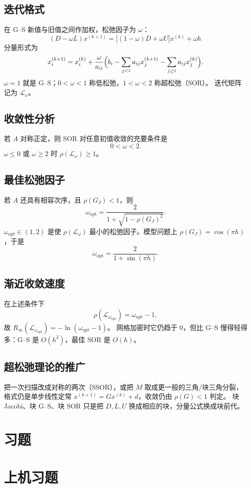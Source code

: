 \subsection{迭代格式}

在 G--S 新值与旧值之间作加权，松弛因子为 \(\omega\)：
\begin{equation}
(D-\omega L)x^{(k+1)}=\bigl[(1-\omega)D+\omega U\bigr]x^{(k)}+\omega b.
\end{equation}
分量形式为
\begin{equation}
x_i^{(k+1)}=x_i^{(k)}+\frac{\omega}{a_{ii}}\Bigl(b_i-\sum_{j<i}a_{ij}x_j^{(k+1)}-\sum_{j\ge i}a_{ij}x_j^{(k)}\Bigr).
\end{equation}
\(\omega=1\) 就是 G--S；\(0<\omega<1\) 称低松弛，\(1<\omega<2\) 称超松弛（SOR）。
迭代矩阵记为 \(\mathcal L_{\omega}\)。

\subsection{收敛性分析}

若 \(A\) 对称正定，则 SOR 对任意初值收敛的充要条件是
\begin{equation}
0<\omega<2.
\end{equation}
\(\omega\le 0\) 或 \(\omega\ge 2\) 时 \(\rho(\mathcal L_{\omega})\ge 1\)。

\subsection{最佳松弛因子}

若 \(A\) 还具有相容次序，且 \(\rho(G_J)<1\)，则
\begin{equation}
\omega_{\mathrm{opt}}=\frac{2}{1+\sqrt{1-\rho(G_J)^{2}}}.
\end{equation}
\(\omega_{\mathrm{opt}}\in(1,2)\) 是使 \(\rho(\mathcal L_{\omega})\) 最小的松弛因子。模型问题上 \(\rho(G_J)=\cos(\pi h)\)，于是
\[
\omega_{\mathrm{opt}}=\frac{2}{1+\sin(\pi h)}.
\]

\subsection{渐近收敛速度}

在上述条件下
\begin{equation}
\rho(\mathcal L_{\omega_{\mathrm{opt}}})=\omega_{\mathrm{opt}}-1,
\end{equation}
故 \(R_{\infty}(\mathcal L_{\omega_{\mathrm{opt}}})=-\ln(\omega_{\mathrm{opt}}-1)\)。
网格加密时它仍趋于 \(0\)，但比 G--S 慢得轻得多：G--S 是 \(O(h^{2})\)，最佳 SOR 是 \(O(h)\)。

\subsection{超松弛理论的推广}

把一次扫描改成对称的两次（SSOR），或把 \(M\) 取成更一般的三角/块三角分裂，格式仍是单步线性定常 \(x^{(k+1)}=Gx^{(k)}+d\)，收敛仍由 \(\rho(G)<1\) 判定。
块 Jacobi、块 G--S、块 SOR 只是把 \(D,L,U\) 换成相应的块，分量公式换成块前代。

\section{习题}

\pending

\section{上机习题}

\pending
